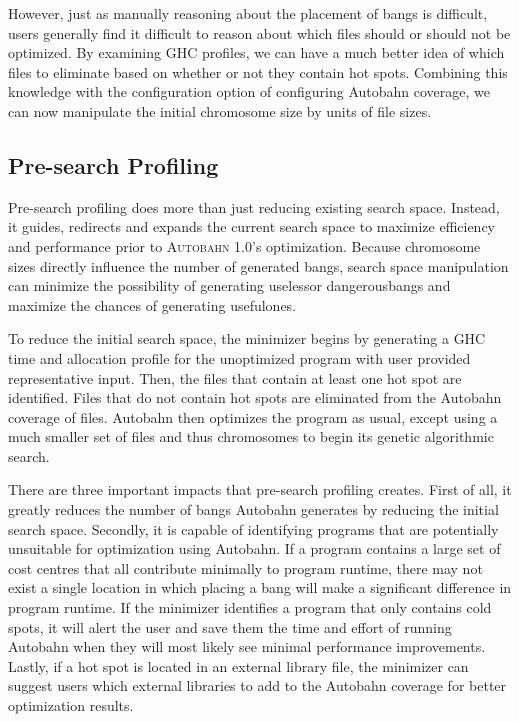 \documentclass[format=sigplan, review=true]{acmart}
\newcommand{\hotspot}[0]{hot spot}
\newcommand{\hotspots}[0]{hot spots}
\newcommand{\coldspots}[0]{cold spots}
\newcommand{\dangerous}[0]{dangerous}
\newcommand{\useful}[0]{useful}
\newcommand{\useless}[0]{useless}
\newcommand{\Ao}[0]{\textsc{Autobahn 1.0}}
\newcommand{\preopt}[0]{pre-search}
\newcommand{\Preopt}[0]{Pre-search}
\begin{document}
However, just as manually reasoning about the placement of bangs is difficult, users generally find it difficult to reason about which files should or should not be optimized. By examining GHC profiles, we can have a much better idea of which files to eliminate based on whether or not they contain \hotspots{}. Combining this knowledge with the configuration option of configuring Autobahn coverage, we can now manipulate the initial chromosome size by units of file sizes. 

\subsection{\Preopt{} Profiling}

\Preopt{} profiling does more than just reducing existing search space. Instead, it guides, redirects and expands the current search space to maximize efficiency and performance prior to \Ao{}'s optimization. Because chromosome sizes directly influence the number of generated bangs, search space manipulation can minimize the possibility of generating \useless or \dangerous bangs and maximize the chances of generating \useful ones.

To reduce the initial search space, the minimizer begins by generating a GHC time and allocation profile for the unoptimized program with user provided representative input. Then, the files that contain at least one \hotspot{} are identified. Files that do not contain \hotspots{} are eliminated from the Autobahn coverage of files. Autobahn then optimizes the program as usual, except using a much smaller set of files and thus chromosomes to begin its genetic algorithmic search. 

There are three important impacts that \preopt{} profiling creates. First of all, it greatly reduces the number of bangs Autobahn generates by reducing the initial search space. Secondly, it is capable of identifying programs that are potentially unsuitable for optimization using Autobahn. If a program contains a large set of cost centres that all contribute minimally to program runtime, there may not exist a single location in which placing a bang will make a significant difference in program runtime. If the minimizer identifies a program that only contains \coldspots{}, it will alert the user and save them the time and effort of running Autobahn when they will most likely see minimal performance improvements. Lastly, if a \hotspot{} is located in an external library file, the minimizer can suggest users which external libraries to add to the Autobahn coverage for better optimization results.
\end{document}
